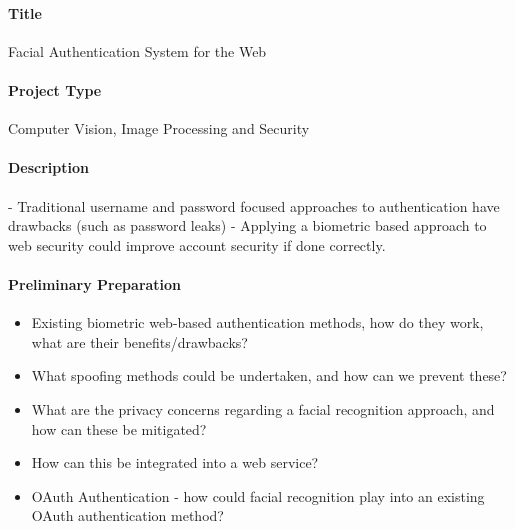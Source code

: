 \documentclass{article}
\begin{document}
    \paragraph{Title}
        Facial Authentication System for the Web
    \paragraph{Project Type}
        Computer Vision, Image Processing and Security
    \paragraph{Description}
        - Traditional username and password focused approaches to authentication have drawbacks (such as password leaks)
        - Applying a biometric based approach to web security could improve account security if done correctly.
    \paragraph{Preliminary Preparation}
        \begin{itemize}
            \item Existing biometric web-based authentication methods, how do they work, what are their benefits/drawbacks?
            \item What spoofing methods could be undertaken, and how can we prevent these?
            \item What are the privacy concerns regarding a facial recognition approach, and how can these be mitigated?
            \item How can this be integrated into a web service?
            \item OAuth Authentication - how could facial recognition play into an existing OAuth authentication method?
        \end{itemize}
\end{document}
